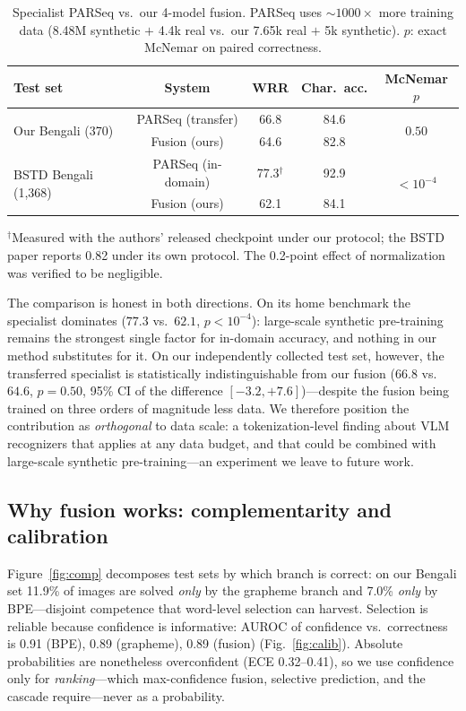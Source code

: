 \documentclass[iicol,pdflatex,sn-mathphys-num]{sn-jnl}
\begin{document}
\begin{table}[t]\centering\small
\caption{Specialist PARSeq vs.\ our 4-model fusion. PARSeq uses
${\sim}1000\times$ more training data (8.48M synthetic $+$ 4.4k real vs.\
our 7.65k real $+$ 5k synthetic). $p$: exact McNemar on paired correctness.}
\label{tab:parseq}
\begin{tabular}{lcccc}
\toprule
Test set & System & WRR & Char.\ acc. & McNemar $p$ \\
\midrule
\multirow{2}{*}{Our Bengali (370)}
 & PARSeq (transfer) & 66.8 & 84.6 & \multirow{2}{*}{$0.50$} \\
 & Fusion (ours)     & 64.6 & 82.8 & \\
\midrule
\multirow{2}{*}{BSTD Bengali (1{,}368)}
 & PARSeq (in-domain) & 77.3$^{\dagger}$ & 92.9 & \multirow{2}{*}{$<10^{-4}$} \\
 & Fusion (ours)      & 62.1 & 84.1 & \\
\bottomrule
\end{tabular}

\smallskip
{\footnotesize $^{\dagger}$Measured with the authors' released checkpoint
under our protocol; the BSTD paper reports 0.82 under its own protocol. The
0.2-point effect of normalization was verified to be negligible.}
\end{table}

The comparison is honest in both directions. On its home benchmark the
specialist dominates ($77.3$ vs.\ $62.1$, $p{<}10^{-4}$): large-scale
synthetic pre-training remains the strongest single factor for in-domain
accuracy, and nothing in our method substitutes for it. On our
independently collected test set, however, the transferred specialist is
statistically indistinguishable from our fusion ($66.8$ vs.\ $64.6$,
$p{=}0.50$, 95\% CI of the difference $[-3.2, +7.6]$)---despite the fusion
being trained on three orders of magnitude less data. We therefore position
the contribution as \emph{orthogonal} to data scale: a tokenization-level
finding about VLM recognizers that applies at any data budget, and that
could be combined with large-scale synthetic pre-training---an experiment we
leave to future work.

\subsection{Why fusion works: complementarity and calibration}
\label{sec:calib}
Figure~\ref{fig:comp} decomposes test sets by which branch is correct: on
our Bengali set 11.9\% of images are solved \emph{only} by the grapheme
branch and 7.0\% \emph{only} by BPE---disjoint competence that word-level
selection can harvest. Selection is reliable because confidence is
informative: AUROC of confidence vs.\ correctness is 0.91 (BPE), 0.89
(grapheme), 0.89 (fusion) (Fig.~\ref{fig:calib}). Absolute probabilities
are nonetheless overconfident (ECE 0.32--0.41), so we use confidence only
for \emph{ranking}---which max-confidence fusion, selective prediction,
and the cascade require---never as a probability.
\end{document}
